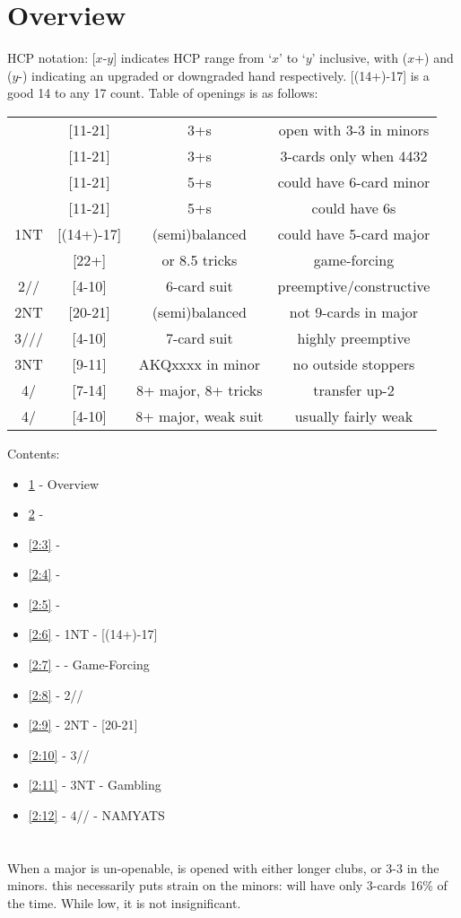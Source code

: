\documentclass[12pt]{report}
\newcommand{\n}{\\}
\newcommand{\ul}[1]{\begin{itemize}#1\end{itemize}}
\newcommand{\li}{\item[~]}
\newcommand{\bidsection}[2]{\section{\texorpdfstring{#1}{#2}}}
\begin{document}
\section{Overview} \label{2:1}
    HCP notation: [$x$-$y$] indicates HCP range from `$x$' to `$y$' inclusive, with ($x$+) and ($y$-) indicating an upgraded or downgraded hand respectively.  [(14+)-17] is a good 14 to any 17 count. Table of openings is as follows:
    
\begin{center}
    \begin{tabular}{ |c|c|c|c| } 
        \hline
        \cl1                     & [11-21]    & 3+\cl{}s             & open with 3-3 in minors \n
        \di1                     & [11-21]    & 3+\di{}s             & 3-cards only when 4432  \n
        \he1                     & [11-21]    & 5+\he{}s             & could have 6-card minor \n
        \sp1                     & [11-21]    & 5+\sp{}s             & could have 6\he{}s      \n
        1NT                      & [(14+)-17] & (semi)balanced       & could have 5-card major \n
        \cl2                     & [22+]      & or 8.5 tricks        & game-forcing            \n
        2\di{}/\he{}/\sp{}       & [4-10]     & 6-card suit          & preemptive/constructive \n
        2NT                      & [20-21]    & (semi)balanced       & not 9-cards in major    \n
        3\cl{}/\di{}/\he{}/\sp{} & [4-10]     & 7-card suit          & highly preemptive       \n
        3NT                      & [9-11]     & AKQxxxx in minor     & no outside stoppers     \n
        4\cl{}/\di{}             & [7-14]     & 8+ major, 8+ tricks  & transfer up-2           \n
        4\he{}/\sp{}             & [4-10]     & 8+ major, weak suit  & usually fairly weak     \n
        \hline
    \end{tabular}
\end{center}
Contents:
\ul {
    \li \ref{2:1} - Overview
    \li \ref{2:2} - 
    \li \ref{2:3} - \di1
    \li \ref{2:4} - \he1
    \li \ref{2:5} - \sp1
    \li \ref{2:6} - 1NT - [(14+)-17]
    \li \ref{2:7} - \cl2 - Game-Forcing
    \li \ref{2:8} - 2\di{}/\he{}/\sp{}
    \li \ref{2:9} - 2NT - [20-21]
    \li \ref{2:10} - 3\cl{}/\di{}/\sp{}
    \li \ref{2:11} - 3NT - Gambling
    \li \ref{2:12} - 4\cl{}/\di{}/\he{}\sp{} - NAMYATS
}
\newpage
\bidsection{}{1♣} \label{2:2}

    When a major is un-openable,  is opened with either longer clubs, or 3-3 in the minors. this necessarily puts strain on the minors:  will have only 3-cards 16\% of the time.  While low, it is not insignificant.\n
    
\end{document}
